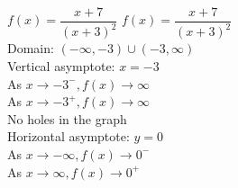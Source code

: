 {$f(x) = \dfrac{x + 7}{(x + 3)^{2}}$}
{$f(x) = \dfrac{x + 7}{(x + 3)^{2}}$ \\
Domain: $(-\infty, -3) \cup (-3, \infty)$\\
Vertical asymptote: $x = -3$\\
As $x \rightarrow -3^{-}, f(x) \rightarrow \infty$\\
As $x \rightarrow -3^{+}, f(x) \rightarrow \infty$\\
No holes in the graph\\
Horizontal asymptote: $y = 0$ \\
As $x \rightarrow -\infty, f(x) \rightarrow 0^{-}$\\
As $x \rightarrow \infty, f(x) \rightarrow 0^{+}$}